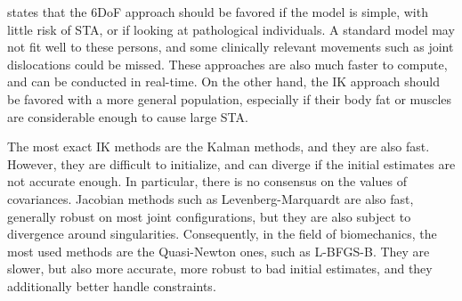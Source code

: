 \cite{Aristidou2018} states that the 6DoF approach should be favored if the model is simple, with little risk of STA, or if looking at pathological individuals. A standard model may not fit well to these persons, and some clinically relevant movements such as joint dislocations could be missed. These approaches are also much faster to compute, and can be conducted in real-time. On the other hand, the IK approach should be favored with a more general population, especially if their body fat or muscles are considerable enough to cause large STA.

The most exact IK methods are the Kalman methods, and they are also fast. However, they are difficult to initialize, and can diverge if the initial estimates are not accurate enough. In particular, there is no consensus on the values of covariances. Jacobian methods such as Levenberg-Marquardt are also fast, generally robust on most joint configurations, but they are also subject to divergence around singularities. Consequently, in the field of biomechanics, the most used methods are the Quasi-Newton ones, such as L-BFGS-B. They are slower, but also more accurate, more robust to bad initial estimates, and they additionally better handle constraints. 


